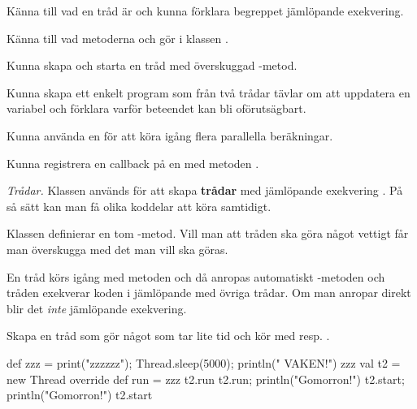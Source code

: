 

\Exercise{\ExeWeekTHIRTEEN}\label{exe:W13}

\begin{Goals}
\item Känna till vad en tråd är och kunna förklara begreppet jämlöpande exekvering.
\item Känna till vad metoderna  och  gör i klassen .
\item Kunna skapa och starta en tråd med överskuggad -metod.
\item Kunna skapa ett enkelt program som från två trådar tävlar om att uppdatera en variabel och förklara varför beteendet kan bli oförutsägbart.
\item Kunna använda en  för att köra igång flera parallella beräkningar.
\item Kunna registrera en callback på en  med metoden .
\end{Goals}

\begin{Preparations}
\item {} 
\end{Preparations}

\BasicTasks %

\Task \emph{Trådar.}  Klassen  används för att skapa  \textbf{trådar} med jämlöpande exekvering . På så sätt kan man få olika koddelar att köra samtidigt. 

Klassen  definierar en tom -metod. Vill man att tråden ska göra något vettigt får man överskugga  med det man vill ska göras. 

En tråd körs igång med metoden  och då anropas automatiskt -metoden och tråden exekverar koden i  jämlöpande med övriga trådar. Om man anropar  direkt blir det \emph{inte} jämlöpande exekvering. 

\Subtask Skapa en tråd som gör något som tar lite tid och kör med  resp. .
\begin{REPL}
def zzz = { print("zzzzzz"); Thread.sleep(5000); println(" VAKEN!")}
zzz
val t2 = new Thread{ override def run = zzz }
t2.run
t2.run; println("Gomorron!")
t2.start; println("Gomorron!")
t2.start
\end{REPL}

